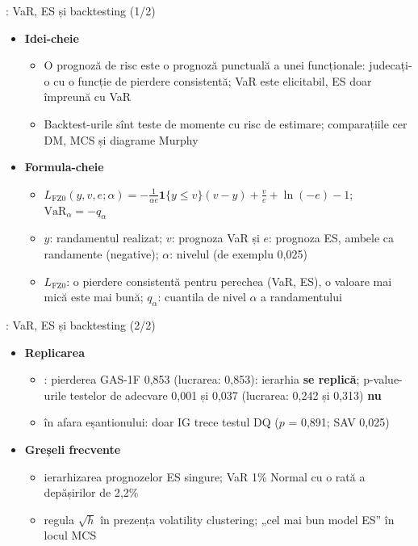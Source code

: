 \begin{frame}{: VaR, ES și backtesting (1/2)}
\itemsize{\footnotesize}
\begin{itemize}
    \item \textbf{Idei-cheie}
    \begin{itemize}
        \item O prognoză de risc este o prognoză punctuală a unei funcționale: judecați-o cu o funcție de pierdere consistentă; VaR este elicitabil, ES doar împreună cu VaR
        \item Backtest-urile sînt teste de momente cu risc de estimare; comparațiile cer DM, MCS și diagrame Murphy
    \end{itemize}
    \item \textbf{Formula-cheie}
    \begin{itemize}
        \item $L_{\mathrm{FZ0}}(y, v, e; \alpha) = -\frac{1}{\alpha e}\mathbf 1\{y \le v\}(v - y) + \frac{v}{e} + \ln(-e) - 1$; $\mathrm{VaR}_\alpha = -q_\alpha$
        \item $y$: randamentul realizat; $v$: prognoza VaR și $e$: prognoza ES, ambele ca randamente (negative); $\alpha$: nivelul (de exemplu 0,025)
        \item $L_{\mathrm{FZ0}}$: o pierdere consistentă pentru perechea (VaR, ES), o valoare mai mică este mai bună; $q_\alpha$: cuantila de nivel $\alpha$ a randamentului
    \end{itemize}
\end{itemize}
\end{frame}

\begin{frame}{: VaR, ES și backtesting (2/2)}
\itemsize{\small}
\begin{itemize}
    \item \textbf{Replicarea}
    \begin{itemize}
        \item {}: pierderea GAS-1F 0{,}853 (lucrarea: 0{,}853): ierarhia \textbf{se replică}; p-value-urile testelor de adecvare 0{,}001 și 0{,}037 (lucrarea: 0{,}242 și 0{,}313) \textbf{nu}
        \item {} în afara eșantionului: doar IG trece testul DQ ($p$ = 0{,}891; SAV 0{,}025)
    \end{itemize}
    \item \textbf{Greșeli frecvente}
    \begin{itemize}
        \item ierarhizarea prognozelor ES singure; VaR 1\% Normal cu o rată a depășirilor de 2{,}2\%
        \item regula $\sqrt{h}$ în prezența volatility clustering; „cel mai bun model ES” în locul MCS
    \end{itemize}
\end{itemize}
\end{frame}

